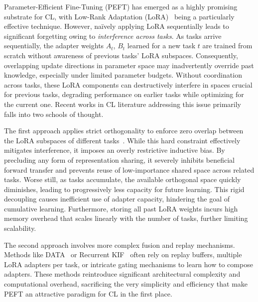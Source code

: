 \documentclass[11pt]{article}
\begin{document}
Parameter-Efficient Fine-Tuning (PEFT) has emerged as a highly promising substrate for CL, with Low-Rank Adaptation (LoRA)~\cite{hu2022lora} being a particularly effective technique. However, naïvely applying LoRA sequentially leads to significant forgetting owing to \textit{interference across tasks}. As tasks arrive sequentially, the adapter weights $A_t$, $B_t$ learned for a new task $t$ are trained from scratch without awareness of previous tasks' LoRA subspaces. Consequently, overlapping update directions in parameter space may inadvertently override past knowledge, especially under limited parameter budgets. Without coordination across tasks, these LoRA components can destructively interfere in spaces crucial for previous tasks, degrading performance on earlier tasks while optimizing for the current one. Recent works in CL literature addressing this issue primarily falls into two schools of thought. 

The first approach applies strict orthogonality to enforce zero overlap between the LoRA subspaces of different tasks~\cite{wang2023orthogonal, qiao2024learn}. While this hard constraint effectively mitigates interference, it imposes an overly restrictive inductive bias. By precluding any form of representation sharing, it severely inhibits beneficial forward transfer and prevents reuse of low-importance shared space across related tasks. Worse still, as tasks accumulate, the available orthogonal space quickly diminishes, leading to progressively less capacity for future learning. This rigid decoupling causes inefficient use of adapter capacity, hindering the goal of cumulative learning. Furthermore, storing all past LoRA weights incurs high memory overhead that scales linearly with the number of tasks, further limiting scalability.

The second approach involves more complex fusion and replay mechanisms. Methods like DATA~\cite{liao2025data} or Recurrent KIF~\cite{feng2025recurrent} often rely on replay buffers, multiple LoRA adapters per task, or intricate gating mechanisms to learn how to compose adapters. These methods reintroduce significant architectural complexity and computational overhead, sacrificing the very simplicity and efficiency that make PEFT an attractive paradigm for CL in the first place.
\end{document}

